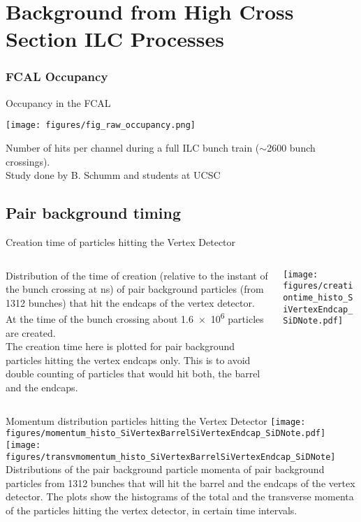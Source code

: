 \documentclass[xcolor={dvipsnames}]{beamer}
\begin{document}
\section{Background from High Cross Section ILC Processes}
\subsubsection{FCAL Occupancy}
\begin{frame}{Occupancy in the FCAL}
  \begin{center}
     \texttt{[image: figures/fig\_raw\_occupancy.png]}
  \end{center}
  Number of hits per channel during a full ILC bunch train ($\sim$2600 bunch crossings).\\
  {\hfill \tiny Study done by B. Schumm and students at UCSC}
\end{frame}

\subsection{Pair background timing}
\begin{frame}{Creation time of particles hitting the Vertex Detector}
\begin{columns}
 \begin{column}{0.4\textwidth}
Distribution of the time of creation (relative to the instant of the bunch crossing at \unit[0]{ns}) of pair background particles (from 1312 bunches) that hit the endcaps of the vertex detector.
At the time of the bunch crossing about \num{1.6e6} particles are created.\\
{\footnotesize The creation time here is plotted for pair background particles hitting the vertex endcaps only. This is to avoid double counting of particles that would hit both, the barrel and the endcaps.}
 \end{column}
 \begin{column}{0.6\textwidth}
 \texttt{[image: figures/creationtime\_histo\_SiVertexEndcap\_SiDNote.pdf]}
 \end{column}
\end{columns}
\end{frame}

\begin{frame}{Momentum distribution particles hitting the Vertex Detector}
  \texttt{[image: figures/momentum\_histo\_SiVertexBarrelSiVertexEndcap\_SiDNote.pdf]}
  \texttt{[image: figures/transvmomentum\_histo\_SiVertexBarrelSiVertexEndcap\_SiDNote]}\\
  Distributions of the pair background particle momenta of pair background particles from 1312 bunches that will hit the barrel and the endcaps of the vertex detector.
  The plots show the histograms of the total and the transverse momenta of the particles hitting the vertex detector, in certain time intervals.
\end{frame}
\end{document}
